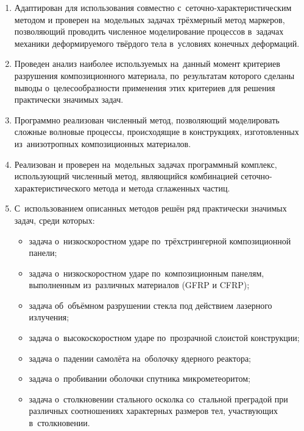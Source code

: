 \documentclass[a4paper,14pt]{extarticle}
\numberwithin{equation}{section}
\begin{document}
    \begin{enumerate}
        \item Адаптирован для использования совместно с~сеточно-характерис\-ти\-чес\-ким методом и проверен на~модельных
              задачах трёхмерный метод маркеров, позволяющий проводить численное моделирование процессов в~задачах механики
              деформируемого твёрдого тела в~условиях конечных деформаций.
        \item Проведен анализ наиболее используемых на~данный момент критериев разрушения композиционного
              материала, по~результатам которого сделаны выводы о~целесообразности применения этих критериев для решения практически
              значимых задач.
        \item Программно реализован численный метод, позволяющий моделировать сложные волновые процессы, происходящие в конструкциях,
              изготовленных из~анизотропных композиционных материалов.
        \item Реализован и проверен на~модельных задачах программный комплекс, использующий численный метод,
              являющийся комбинацией сеточно-характеристического метода и метода сглаженных частиц.
        \item С~использованием описанных методов решён ряд практически значимых задач, среди которых:
            \begin{itemize}
                \item задача о~низкоскоростном ударе по~трёхстрингерной композиционной панели;
                \item задача о~низкоскоростном ударе по~композиционным панелям, выполненным из~различных материалов
                      (GFRP и CFRP);
                \item задача об~объёмном разрушении стекла под действием лазерного излучения;
                \item задача о~высокоскоростном ударе по~прозрачной слоистой конструкции;
                \item задача о~падении самолёта на~оболочку ядерного реактора;
                \item задача о~пробивании оболочки спутника микрометеоритом;
                \item задача о~столкновении стального осколка со~стальной преградой при различных соотношениях
                      характерных размеров  тел, участвующих в~столкновении.
            \end{itemize}
    \end{enumerate}
\end{document}

